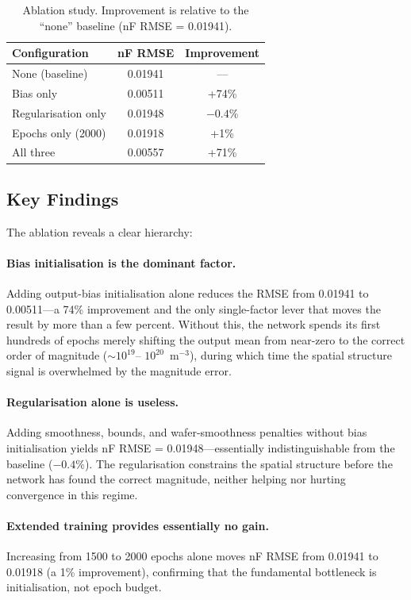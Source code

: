 \documentclass[12pt,a4paper]{article}
\begin{document}
\begin{table}[H]
  \centering
  \caption{Ablation study.  Improvement is relative to the ``none''
           baseline (nF RMSE = 0.01941).}
  \label{tab:ablation}
  \begin{tabular}{lcc}
    \toprule
    Configuration & nF RMSE & Improvement \\
    \midrule
    None (baseline)     & 0.01941 & ---   \\
    Bias only           & 0.00511 & +74\% \\
    Regularisation only & 0.01948 & $-0.4$\%\\
    Epochs only (2000)  & 0.01918 & +1\% \\
    All three           & 0.00557 & +71\% \\
    \bottomrule
  \end{tabular}
\end{table}

\subsection{Key Findings}

The ablation reveals a clear hierarchy:

\paragraph{Bias initialisation is the dominant factor.}
Adding output-bias initialisation alone reduces the RMSE from 0.01941
to 0.00511---a 74\% improvement and the only single-factor lever that
moves the result by more than a few percent.  Without this, the
network spends its first hundreds of epochs merely shifting the output
mean from near-zero to the correct order of magnitude ($\sim 10^{19}$--
$10^{20}$~m$^{-3}$), during which time the spatial structure signal
is overwhelmed by the magnitude error.

\paragraph{Regularisation alone is useless.}
Adding smoothness, bounds, and wafer-smoothness penalties without bias
initialisation yields nF RMSE = 0.01948---essentially indistinguishable
from the baseline ($-0.4\%$).  The regularisation constrains the
spatial structure before the network has found the correct magnitude,
neither helping nor hurting convergence in this regime.

\paragraph{Extended training provides essentially no gain.}
Increasing from 1500 to 2000 epochs alone moves nF RMSE from 0.01941
to 0.01918 (a 1\% improvement), confirming that the fundamental
bottleneck is initialisation, not epoch budget.
\end{document}

